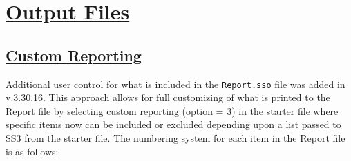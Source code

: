 \hypertarget{OutputFiles}{}
\section[Output Files]{\protect\hyperlink{OutputFiles}{Output Files}}

\hypertarget{CustomReporting}{}
\subsection[Custom Reporting]{\protect\hyperlink{CustomReporting}{Custom Reporting}}
\hypertarget{custom}{} 
Additional user control for what is included in the \texttt{Report.sso} file was added in v.3.30.16. This approach allows for full customizing of what is printed to the Report file by selecting custom reporting (option = 3) in the starter file where specific items now can be included or excluded depending upon a list passed to SS3 from the starter file. The numbering system for each item in the Report file is as follows:

